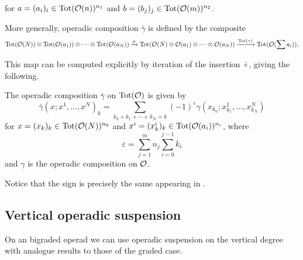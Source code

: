 \documentclass[join.tex]{subfiles}
\begin{document}
for $a=(a_i)_i\in \mathrm{Tot}({\mathcal O}(n))^{n_1}$ and $b=(b_j)_j\in \mathrm{Tot}({\mathcal O}(m))^{n_2}$.

More generally, operadic composition $\bar{\gamma}$ is defined by the composite
\begin{equation*}
\mathrm{Tot}({\mathcal O}(N))\otimes \mathrm{Tot}({\mathcal O}(a_1))\otimes\cdots\otimes \mathrm{Tot}({\mathcal O}(a_N))\xrightarrow{\mu} \mathrm{Tot}({\mathcal O}(N)\otimes {\mathcal O}(a_1)\otimes\cdots\otimes {\mathcal O}(a_N)) \xrightarrow{\mathrm{Tot}(\gamma)} \mathrm{Tot}({\mathcal O}(\sum a_i)),
\end{equation*}

This map can be computed explicitly by iteration of the insertion $\bar{\circ}$, giving the following.  %

\begin{lem}\label{totcomp}
The operadic composition $\bar{\gamma}$ on $\mathrm{Tot}({\mathcal O})$ is given by
\begin{equation*}%
\bar{\gamma}(x;x^1,\dots, x^N)_k=\sum_{k_0+k_1+\cdots+k_N=k}(-1)^{\varepsilon}\gamma(x_{k_0};x^1_{k_1},\dots, x^N_{k_N})
\end{equation*}
for $x=(x_k)_k\in\mathrm{Tot}({\mathcal O}(N))^{n_0}$ and $x^i=(x^i_k)_k\in\mathrm{Tot}({\mathcal O}(a_i))^{n_i}$, where 
\begin{equation}
\varepsilon=\sum_{j=1}^m n_j\sum_{i=0}^{j-1}k_i
\end{equation}
and $\gamma$ is the operadic composition on ${\mathcal O}$.
\end{lem}
Notice that the sign is precisely the same appearing in .




\subsection{Vertical operadic suspension}
On an bigraded operad we can use operadic suspension on the vertical degree with analogue results to those of the graded case. %

\end{document}
